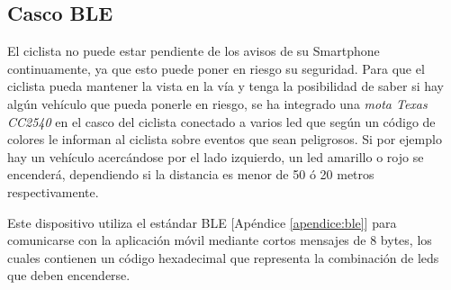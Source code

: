 \subsection{Casco BLE}\label{ssection:cascoBLE}
El ciclista no puede estar pendiente de los avisos de su Smartphone continuamente,
ya que esto puede poner en riesgo su seguridad. Para que el ciclista pueda mantener
la vista en la vía y tenga la posibilidad de saber si hay algún vehículo que pueda
ponerle en riesgo, se ha integrado una \emph{mota Texas CC2540} en el casco del
ciclista conectado a varios led que según un código de colores le informan al ciclista
sobre eventos que sean peligrosos. Si por ejemplo hay un vehículo acercándose por
el lado izquierdo, un led amarillo o rojo se encenderá, dependiendo si la distancia
es menor de 50 ó 20 metros respectivamente.

Este dispositivo utiliza el estándar BLE [Apéndice \ref{apendice:ble}] para comunicarse con la aplicación móvil
mediante cortos mensajes de 8 bytes, los cuales contienen un código hexadecimal que
representa la combinación de leds que deben encenderse.


